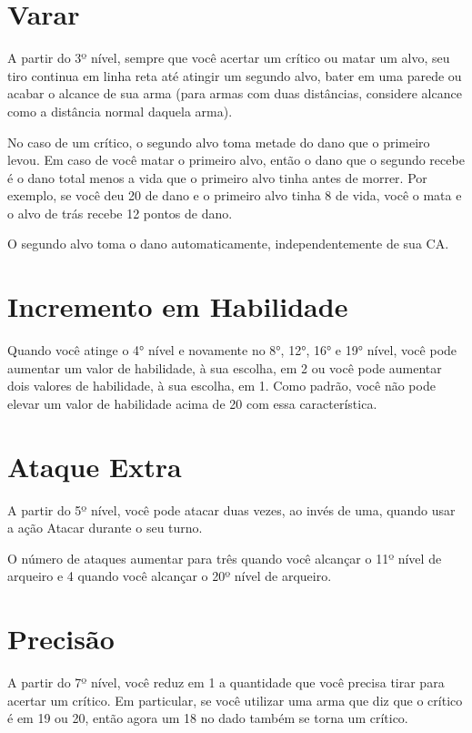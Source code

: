 \begin{multicols}{2}
\section*{Varar}%

A partir do 3º nível, sempre que você acertar um crítico ou matar um alvo, seu
tiro continua em linha reta até atingir um segundo alvo, bater em uma parede ou
acabar o alcance de sua arma (para armas com duas distâncias, considere alcance
como a distância normal daquela arma).

No caso de um crítico, o segundo alvo toma metade do dano que o primeiro levou.
Em caso de você matar o primeiro alvo, então o dano que o segundo recebe é o
dano total menos a vida que o primeiro alvo tinha antes de morrer. Por exemplo,
se você deu 20 de dano e o primeiro alvo tinha 8 de vida, você o mata e o alvo
de trás recebe 12 pontos de dano.

O segundo alvo toma o dano automaticamente, independentemente de sua CA.

\section*{Incremento em Habilidade}%

Quando você atinge o 4° nível e novamente no 8°, 12°, 16° e 19° nível, você pode
aumentar um valor de habilidade, à sua escolha, em 2 ou você pode aumentar dois
valores de habilidade, à sua escolha, em 1. Como padrão, você não pode elevar um
valor de habilidade acima de 20 com essa característica.

\section*{Ataque Extra}%

A partir do 5º nível, você pode atacar duas vezes, ao invés de uma, quando usar
a ação Atacar durante o seu turno.

O número de ataques aumentar para três quando você alcançar o 11º nível de
arqueiro e 4 quando você alcançar o 20º nível de arqueiro.


\section*{Precisão}%

A partir do 7º nível, você reduz em 1 a quantidade que você precisa tirar para
acertar um crítico. Em particular, se você utilizar uma arma que diz que o
crítico é em 19 ou 20, então agora um 18 no dado também se torna um crítico.


\end{multicols}
